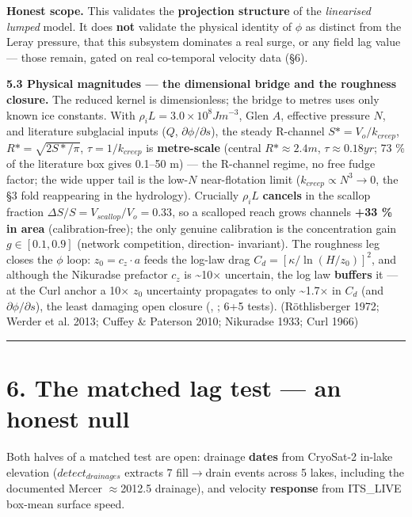\documentclass[11pt]{article}
\begin{document}
\textbf{Honest scope.} This validates the \textbf{projection structure} of the \emph{linearised lumped} model. It does \textbf{not} validate the physical identity of $\phi $ as distinct from the Leray pressure, that this subsystem dominates a real surge, or any field lag value — those remain, gated on real co-temporal velocity data (§6).


\textbf{5.3 Physical magnitudes — the dimensional bridge and the roughness closure.} The reduced kernel is dimensionless; the bridge to metres uses only known ice constants. With $\rho _{i}L=3.0\times 10^{8} J m^{-3}$, Glen $A$, effective pressure $N$, and literature subglacial inputs ($Q$, $\partial \phi /\partial s$), the steady R-channel $S*=V_{o}/k_{creep}$, $R*=\sqrt{2S*/\pi }$, $\tau =1/k_{creep}$ is \textbf{metre-scale} (central $R*\approx 2.4 m$, $\tau \approx 0.18 yr$; 73 \% of the literature box gives 0.1–50 m) — the R-channel regime, no free fudge factor; the wide upper tail is the low-$N$ near-flotation limit ($k_{creep}\propto N^{3}\to 0$, the §3 fold reappearing in the hydrology). Crucially $\rho _{i}L$ \textbf{cancels} in the scallop fraction $\Delta S/S=V_{scallop}/V_{o}=0.33$, so a scalloped reach grows channels \textbf{+33 \% in area} (calibration-free); the only genuine calibration is the concentration gain $g\in [0.1,0.9]$ (network competition, direction- invariant). The roughness leg closes the $\phi $ loop: $z_{0}=c_{z}\cdot a$ feeds the log-law drag $C_{d}=[\kappa /\ln(H/z_{0})]^{2}$, and although the Nikuradse prefactor $c_{z}$ is \textasciitilde{}10\ensuremath{\times} uncertain, the log law \textbf{buffers} it — at the Curl anchor a 10\ensuremath{\times} $z_{0}$ uncertainty propagates to only \textasciitilde{}1.7\ensuremath{\times} in $C_{d}$ (and $\partial \phi /\partial s$), the least damaging open closure (, ; 6+5 tests). (Röthlisberger 1972; Werder et al. 2013; Cuffey \& Paterson 2010; Nikuradse 1933; Curl 1966)


\medskip\hrule\medskip


\section*{6. The matched lag test — an honest null}


Both halves of a matched test are open: drainage \textbf{dates} from CryoSat-2 in-lake elevation ($detect_{drainages}$ extracts 7 fill\ensuremath{\to}drain events across 5 lakes, including the documented Mercer \ensuremath{\approx}2012.5 drainage), and velocity \textbf{response} from ITS\_LIVE box-mean surface speed.
\end{document}
